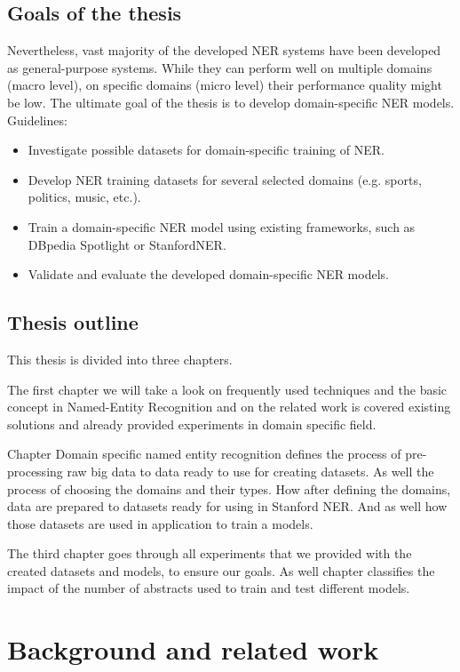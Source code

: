 \documentclass[thesis=M,english]{FITthesis}[2018/05/30]
\begin{document}
\begin{introduction}
\section{Goals of the thesis}	
	Nevertheless, vast majority of the developed NER systems have been developed as general-purpose systems. While they can perform well on multiple domains (macro level), on specific domains (micro level) their performance quality might be low. The ultimate goal of the thesis is to develop domain-specific NER models. Guidelines:
\begin{itemize}
	\item Investigate possible datasets for domain-specific training of NER.
	\item Develop NER training datasets for several selected domains (e.g. sports,
politics, music, etc.).
	\item Train a domain-specific NER model using existing frameworks, such as
DBpedia Spotlight or StanfordNER.
	\item Validate and evaluate the developed domain-specific NER models. 
\end{itemize}	
	
\section{Thesis outline}

This thesis is divided into three chapters.

The first chapter we will take a look on frequently used techniques and the basic concept in Named-Entity Recognition and on the related work is covered existing solutions and already provided experiments in domain specific field.

Chapter Domain specific named entity recognition defines the process of pre-processing raw big data to data ready to use for creating datasets. As well the process of choosing the domains and their types. How after defining the domains, data are prepared to datasets ready for using in Stanford NER. And as well how those datasets are used in application to train a models.

The third chapter goes through all experiments that we provided with the created datasets and models, to ensure our goals. As well chapter classifies the impact of the number of abstracts used to train and test different models.
	

\end{introduction}

\chapter{Background and related work}\label{}
\end{document}
